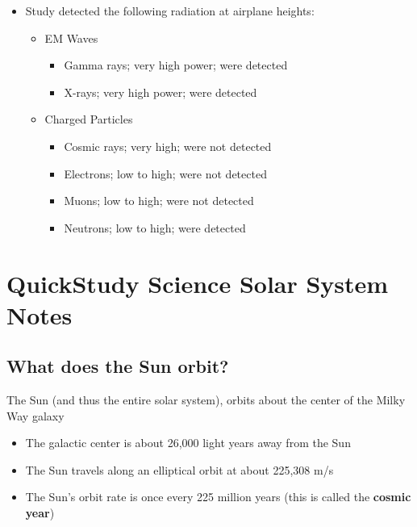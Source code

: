 \documentclass[a4paper]{article}
\begin{document}
\begin{itemize}
\begin{itemize}
				\item Study detected the following radiation at airplane heights:
					\begin{itemize}
						 \item EM Waves
						 	\begin{itemize}
						 		\item Gamma rays;  very high power;   were detected
						 		\item X-rays;   very high power;    were detected 
						 	\end{itemize}
						 \item Charged Particles 	
						 	\begin{itemize}
						 		\item Cosmic rays;   very high;   were not detected
						 		\item Electrons;   low to high;   were not detected
						 		\item Muons;    low to high;     were not detected
						 		\item Neutrons;    low to high;  were detected 
						 	\end{itemize}
					\end{itemize}
			\end{itemize}
	\end{itemize}
	\section{QuickStudy Science Solar System Notes}
		\subsection*{What does the Sun orbit?}
		The Sun (and thus the entire solar system), orbits about the center of the Milky Way galaxy
			\begin{itemize}
				\item The galactic center is about 26,000 light years away from the Sun
				\item The Sun travels along an elliptical orbit at about 225,308 m/s 
				\item The Sun's orbit rate is once every 225 million years (this is called the \textbf{cosmic year})
			\end{itemize}
\end{document}

